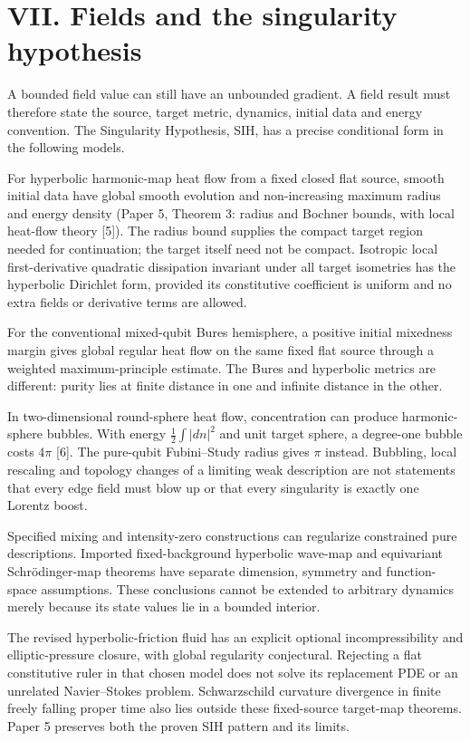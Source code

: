 \documentclass[
  11pt,
  a4paper,
]{article}
\begin{document}
\section{VII. Fields and the singularity hypothesis}\label{vii.-fields-and-the-singularity-hypothesis}

A bounded field value can still have an unbounded gradient. A field result must therefore state the source, target metric, dynamics, initial data and energy convention. The Singularity Hypothesis, SIH, has a precise conditional form in the following models.

For hyperbolic harmonic-map heat flow from a fixed closed flat source, smooth initial data have global smooth evolution and non-increasing maximum radius and energy density (Paper 5, Theorem 3: radius and Bochner bounds, with local heat-flow theory {[}5{]}). The radius bound supplies the compact target region needed for continuation; the target itself need not be compact. Isotropic local first-derivative quadratic dissipation invariant under all target isometries has the hyperbolic Dirichlet form, provided its constitutive coefficient is uniform and no extra fields or derivative terms are allowed.

For the conventional mixed-qubit Bures hemisphere, a positive initial mixedness margin gives global regular heat flow on the same fixed flat source through a weighted maximum-principle estimate. The Bures and hyperbolic metrics are different: purity lies at finite distance in one and infinite distance in the other.

In two-dimensional round-sphere heat flow, concentration can produce harmonic-sphere bubbles. With energy \(\tfrac12\int|dn|^2\) and unit target sphere, a degree-one bubble costs \(4\pi\) {[}6{]}. The pure-qubit Fubini--Study radius gives \(\pi\) instead. Bubbling, local rescaling and topology changes of a limiting weak description are not statements that every edge field must blow up or that every singularity is exactly one Lorentz boost.

Specified mixing and intensity-zero constructions can regularize constrained pure descriptions. Imported fixed-background hyperbolic wave-map and equivariant Schrödinger-map theorems have separate dimension, symmetry and function-space assumptions. These conclusions cannot be extended to arbitrary dynamics merely because its state values lie in a bounded interior.

The revised hyperbolic-friction fluid has an explicit optional incompressibility and elliptic-pressure closure, with global regularity conjectural. Rejecting a flat constitutive ruler in that chosen model does not solve its replacement PDE or an unrelated Navier--Stokes problem. Schwarzschild curvature divergence in finite freely falling proper time also lies outside these fixed-source target-map theorems. Paper 5 preserves both the proven SIH pattern and its limits.
\end{document}
